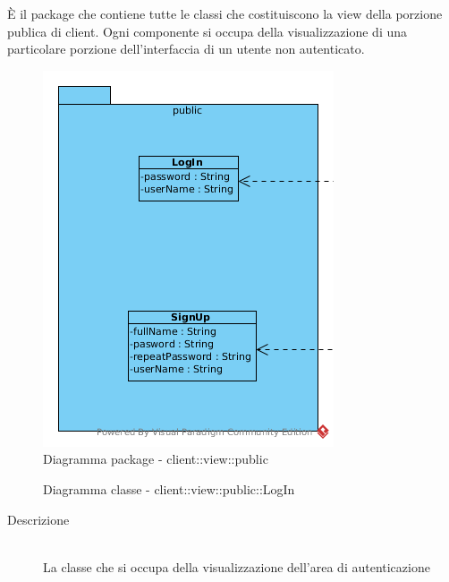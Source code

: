 È il package che contiene tutte le classi che costituiscono la view della porzione publica di client. Ogni componente si occupa della visualizzazione di una particolare porzione dell'interfaccia di un utente non autenticato.\begin{center}
	\begin{figure}[H]
		\centering \includegraphics[scale=4, max width=\textwidth, max height=\myheight]{../img/diagrammiClassi/client/view/public.png}
		\caption{Diagramma package - client::view::public}
	\end{figure}
\end{center}\hypertarget{client::view::public::LogIn}{}
\begin{figure}[H]
	\centering
	\caption{Diagramma classe - client::view::public::LogIn}
\end{figure}\begin{description}
\item[Descrizione] \hfill \\
La classe che si occupa della visualizzazione dell'area di autenticazione
\end{description}

